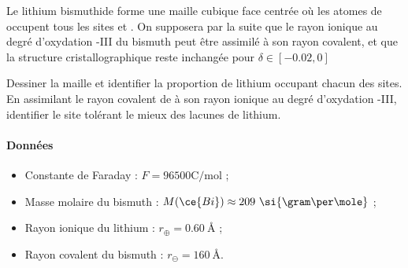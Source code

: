 Le lithium bismuthide  forme une maille cubique face centrée où les atomes de  occupent tous les sites  et . On supposera par la suite que le rayon ionique au degré d'oxydation -III du bismuth peut être assimilé à son rayon covalent, et que la structure cristallographique reste inchangée pour $\delta \in [-0.02, 0]$

\Q Dessiner la maille et identifier la proportion de lithium occupant chacun des sites. En assimilant le rayon covalent de  à son rayon ionique au degré d'oxydation -III, identifier le site tolérant le mieux des lacunes de lithium.





\paragraph*{Données}
\begin{itemize}
\item Constante de Faraday : $F = 96500 \si{\coulomb\per\mole}$ ;
\item Masse molaire du bismuth : $M ( \ce{Bi} ) \approx 209 ~ \si{\gram\per\mole}$ ;
\item Rayon ionique du lithium : $r_\oplus = 0.60 ~ \si{\angstrom}$ ;
\item Rayon covalent du bismuth : $r_\ominus = 160 ~ \si{\angstrom}$.
\end{itemize}